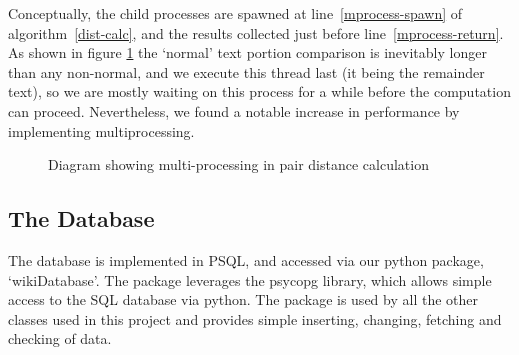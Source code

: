 Conceptually, the child processes are spawned at
line~\ref{mprocess-spawn} of algorithm~\ref{dist-calc}, and the
results collected just before line~\ref{mprocess-return}. As shown in
figure \ref{fig:mprocessing} the `normal' text portion comparison is
inevitably longer than any non-normal, and we execute this thread last
(it being the remainder text), so we are mostly waiting on this
process for a while before the computation can proceed. Nevertheless,
we found a notable increase in performance by implementing
multiprocessing.

\begin{figure}
  \centering
  \caption{Diagram showing multi-processing in pair distance
    calculation}
  \label{fig:mprocessing}
\end{figure}

\subsection*{The Database}
The database is implemented in PSQL, and accessed via our python
package, `wikiDatabase'. The package leverages the psycopg library,
which allows simple access to the SQL database via
python.\cite{psycopg2} The package is used by all the other classes
used in this project and provides simple inserting, changing, fetching
and checking of data.

